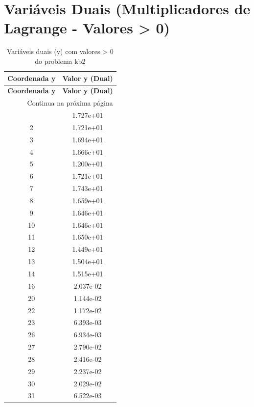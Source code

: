 \documentclass[12pt]{article}
\begin{document}
\section{Variáveis Duais (Multiplicadores de Lagrange - Valores > 0)}

\begin{longtable}{@{}cc@{}}
\caption{Variáveis duais (y) com valores > 0 do problema kb2} \\
\toprule
\textbf{Coordenada y} & \textbf{Valor y (Dual)} \\
\midrule
\endfirsthead

\toprule
\textbf{Coordenada y} & \textbf{Valor y (Dual)} \\
\midrule
\endhead

\midrule \multicolumn{2}{r}{{Continua na próxima página}} \\ \midrule
\endfoot

\bottomrule
\endlastfoot
1 & 1.727e+01 \\
2 & 1.721e+01 \\
3 & 1.694e+01 \\
4 & 1.666e+01 \\
5 & 1.200e+01 \\
6 & 1.721e+01 \\
7 & 1.743e+01 \\
8 & 1.659e+01 \\
9 & 1.646e+01 \\
10 & 1.646e+01 \\
11 & 1.650e+01 \\
12 & 1.449e+01 \\
13 & 1.504e+01 \\
14 & 1.515e+01 \\
16 & 2.037e-02 \\
20 & 1.144e-02 \\
22 & 1.172e-02 \\
23 & 6.393e-03 \\
26 & 6.934e-03 \\
27 & 2.790e-02 \\
28 & 2.416e-02 \\
29 & 2.237e-02 \\
30 & 2.029e-02 \\
31 & 6.522e-03 \\

\bottomrule
\end{longtable}
\end{document}
